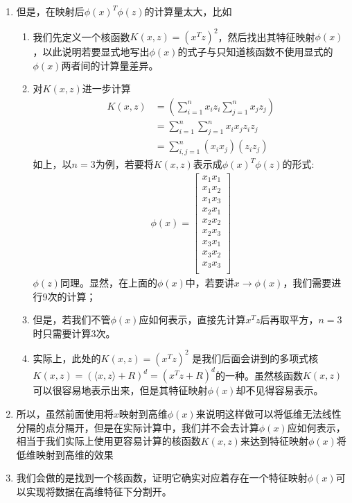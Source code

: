 \begin{enumerate}
	\item 但是，在映射后$\phi(x)^T \phi(z)$的计算量太大，比如
	\begin{enumerate}
		\item 我们先定义一个核函数$K(x, z)=(x^T z)^2$，然后找出其特征映射$\phi(x)$，以此说明若要显式地写出$\phi(x)$的式子与只知道核函数不使用显式的$\phi(x)$两者间的计算量差异。
		\item 对$K(x, z)$进一步计算
		\begin{align}
			K(x, z) &= \left(\sum_{i=1}^{n}x_iz_i \sum_{j=1}^{n}x_jz_j \right) \\
			&= \sum_{i=1}^{n} \sum_{j=1}^{n} x_i x_j z_i z_j \\
			&= \sum_{i,j=1}^{n}(x_i x_j) (z_i z_j)
		\end{align}
		如上，以$n=3$为例，若要将$K(x, z)$表示成$\phi(x)^T\phi(z)$的形式:
		\begin{align}
			\phi(x) = \left[\begin{matrix}x_1 x_1 \\ x_1 x_2 \\ x_1 x_3 \\ x_2 x_1 \\ x_2 x_2 \\ x_2 x_3 \\ x_3 x_1 \\ x_3 x_2 \\ x_3 x_3 \\\end{matrix}\right]
		\end{align}
		$\phi(z)$同理。显然，在上面的$\phi(x)$中，若要讲$x \to \phi(x)$，我们需要进行9次的计算；
		\item 但是，若我们不管$\phi(x)$应如何表示，直接先计算$x^Tz$后再取平方，$n=3$时只需要计算3次。
		\item 实际上，此处的$K(x, z) = (x^T z)^2$ 是我们后面会讲到的多项式核$K(x,z)=\left(\langle x, z \rangle +R \right)^d = \left(x^Tz +R\right)^d$的一种。虽然核函数$K(x,z)$可以很容易地表示出来，但是其特征映射$\phi(x)$却不见得容易表示。
	\end{enumerate}

	\item 所以，虽然前面使用将$x$映射到高维$\phi(x)$来说明这样做可以将低维无法线性分隔的点分隔开，但是在实际计算中，我们并不会去计算$\phi(x)$应如何表示，相当于我们实际上使用更容易计算的核函数$K(x, z)$来达到特征映射$\phi(x)$将低维映射到高维的效果

	\item 我们会做的是找到一个核函数，证明它确实对应着存在一个特征映射$\phi(x)$可以实现将数据在高维特征下分割开。


\end{enumerate}
